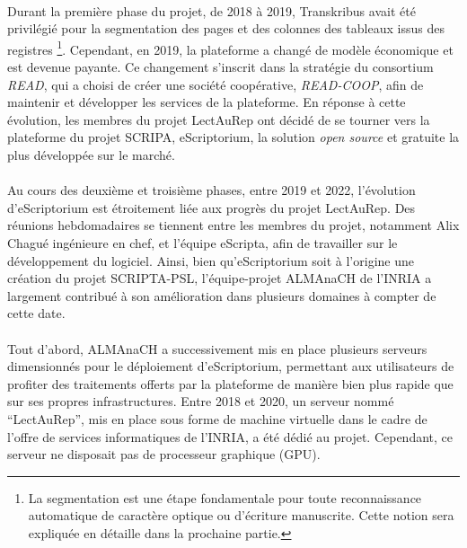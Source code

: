 \documentclass[a4paper,12pt,twoside]{book}
\begin{document}
\paragraph{}
Durant la première phase du projet, de 2018 à 2019, Transkribus avait été privilégié pour la segmentation des pages et des colonnes des tableaux issus des registres \footnote{La segmentation est une étape fondamentale pour toute reconnaissance automatique de caractère optique ou d'écriture manuscrite. Cette notion sera expliquée en détaille dans la prochaine partie.}. Cependant, en 2019, la plateforme a changé de modèle économique et est devenue payante. Ce changement s'inscrit dans la stratégie du consortium \textit{READ}, qui a choisi de créer une société coopérative, \textit{READ-COOP}, afin de maintenir et développer les services de la plateforme. En réponse à cette évolution, les membres du projet LectAuRep ont décidé de se tourner vers la plateforme du projet SCRIPA, eScriptorium, la solution \textit{open source} et gratuite la plus développée sur le marché.

\paragraph{}
Au cours des deuxième et troisième phases, entre 2019 et 2022, l'évolution d’eScriptorium est étroitement liée aux progrès du projet LectAuRep. Des réunions hebdomadaires se tiennent entre les membres du projet, notamment Alix Chagué ingénieure en chef, et l'équipe eScripta, afin de travailler sur le développement du logiciel. Ainsi, bien qu’eScriptorium soit à l'origine une création du projet SCRIPTA-PSL, l’équipe-projet ALMAnaCH de l'INRIA a largement contribué à son amélioration dans plusieurs domaines à compter de cette date.

\paragraph{}
Tout d'abord, ALMAnaCH a successivement mis en place plusieurs serveurs dimensionnés pour le déploiement d'eScriptorium, permettant aux utilisateurs de profiter des traitements offerts par la plateforme de manière bien plus rapide que sur ses propres infrastructures. Entre 2018 et 2020, un serveur nommé \enquote{LectAuRep}, mis en place sous forme de machine virtuelle dans le cadre de l’offre de services informatiques de l'INRIA, a été dédié au projet. Cependant, ce serveur ne disposait pas de processeur graphique (GPU). 
\end{document}
